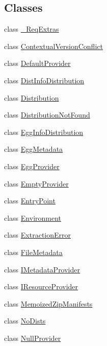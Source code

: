 \subsection*{Classes}
\begin{DoxyCompactItemize}
\item 
class \hyperlink{classpkg__resources_1_1___req_extras}{\+\_\+\+Req\+Extras}
\item 
class \hyperlink{classpkg__resources_1_1_contextual_version_conflict}{Contextual\+Version\+Conflict}
\item 
class \hyperlink{classpkg__resources_1_1_default_provider}{Default\+Provider}
\item 
class \hyperlink{classpkg__resources_1_1_dist_info_distribution}{Dist\+Info\+Distribution}
\item 
class \hyperlink{classpkg__resources_1_1_distribution}{Distribution}
\item 
class \hyperlink{classpkg__resources_1_1_distribution_not_found}{Distribution\+Not\+Found}
\item 
class \hyperlink{classpkg__resources_1_1_egg_info_distribution}{Egg\+Info\+Distribution}
\item 
class \hyperlink{classpkg__resources_1_1_egg_metadata}{Egg\+Metadata}
\item 
class \hyperlink{classpkg__resources_1_1_egg_provider}{Egg\+Provider}
\item 
class \hyperlink{classpkg__resources_1_1_empty_provider}{Empty\+Provider}
\item 
class \hyperlink{classpkg__resources_1_1_entry_point}{Entry\+Point}
\item 
class \hyperlink{classpkg__resources_1_1_environment}{Environment}
\item 
class \hyperlink{classpkg__resources_1_1_extraction_error}{Extraction\+Error}
\item 
class \hyperlink{classpkg__resources_1_1_file_metadata}{File\+Metadata}
\item 
class \hyperlink{classpkg__resources_1_1_i_metadata_provider}{I\+Metadata\+Provider}
\item 
class \hyperlink{classpkg__resources_1_1_i_resource_provider}{I\+Resource\+Provider}
\item 
class \hyperlink{classpkg__resources_1_1_memoized_zip_manifests}{Memoized\+Zip\+Manifests}
\item 
class \hyperlink{classpkg__resources_1_1_no_dists}{No\+Dists}
\item 
class \hyperlink{classpkg__resources_1_1_null_provider}{Null\+Provider}

\end{DoxyCompactItemize}
